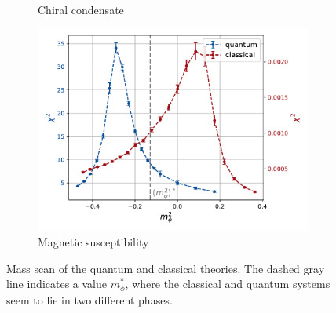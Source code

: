 \begin{figure}
\begin{subfigure}[b]{0.45\textwidth}
        \caption{Chiral condensate}
    \end{subfigure}
    \begin{subfigure}[b]{0.45\textwidth}
        \includegraphics[scale=0.5]{figures/chiral_PT/mass_scan/susceptibility.pdf}
        \caption{Magnetic susceptibility}
    \end{subfigure}
    \caption[Mass scan of the quantum and classical theories]{Mass scan of the quantum and classical theories. The dashed gray line indicates a value $m_\phi^*$, where the classical and quantum systems seem to lie in two different phases.}
\end{figure}

